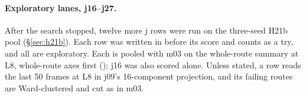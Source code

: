 \paragraph{Exploratory lanes, j16--j27.}
After the search stopped, twelve more j rows were run on the three-seed H21b pool
(\S\ref{sec:h21b}). Each row was written in  before its score
and counts as a try, and all are exploratory. Each is pooled with m03 on the
whole-route summary at L8, whole-route axes first (); j16 was
also scored alone. Unless stated, a row reads the last 50 frames at L8 in j09's
16-component projection, and its failing routes are Ward-clustered and cut as in
m03.
